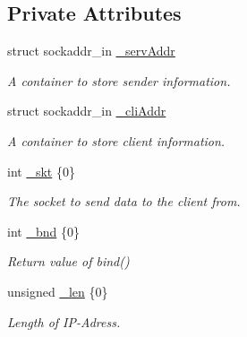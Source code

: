 \subsection*{Private Attributes}
\begin{DoxyCompactItemize}
\item 
struct sockaddr\+\_\+in \hyperlink{classconnector_1_1receiver_a60b325418fa641caf8a707b02f844dab}{\+\_\+serv\+Addr}
\begin{DoxyCompactList}\small\item\em A container to store sender information. \end{DoxyCompactList}\item 
struct sockaddr\+\_\+in \hyperlink{classconnector_1_1receiver_a3135a18b561119ff8faeeb05ad918393}{\+\_\+cli\+Addr}
\begin{DoxyCompactList}\small\item\em A container to store client information. \end{DoxyCompactList}\item 
int \hyperlink{classconnector_1_1receiver_a93d94040afe6ee73dc0c2db54d61e627}{\+\_\+skt} \{0\}\hypertarget{classconnector_1_1receiver_a93d94040afe6ee73dc0c2db54d61e627}{}\label{classconnector_1_1receiver_a93d94040afe6ee73dc0c2db54d61e627}

\begin{DoxyCompactList}\small\item\em The socket to send data to the client from. \end{DoxyCompactList}\item 
int \hyperlink{classconnector_1_1receiver_a89bee1b4f796e5a1e5fed354e4574430}{\+\_\+bnd} \{0\}\hypertarget{classconnector_1_1receiver_a89bee1b4f796e5a1e5fed354e4574430}{}\label{classconnector_1_1receiver_a89bee1b4f796e5a1e5fed354e4574430}

\begin{DoxyCompactList}\small\item\em Return value of {\ttfamily bind()} \end{DoxyCompactList}\item 
unsigned \hyperlink{classconnector_1_1receiver_afc3cc2fa404084c755d75e8017fa97bd}{\+\_\+len} \{0\}\hypertarget{classconnector_1_1receiver_afc3cc2fa404084c755d75e8017fa97bd}{}\label{classconnector_1_1receiver_afc3cc2fa404084c755d75e8017fa97bd}

\begin{DoxyCompactList}\small\item\em Length of I\+P-\/\+Adress. \end{DoxyCompactList}\end{DoxyCompactItemize}



